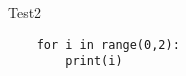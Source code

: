\documentclass{article}
\begin{document}
Test2

\begin{verbatim}
    for i in range(0,2):
        print(i)
\end{verbatim}
\end{document}
